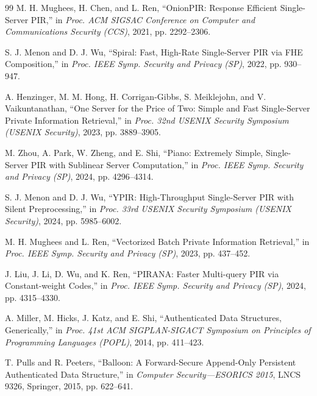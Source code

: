 \begin{thebibliography}{99}
M. H. Mughees, H. Chen, and L. Ren,
\newblock ``OnionPIR: Response Efficient Single-Server PIR,''
\newblock in \emph{Proc. ACM SIGSAC Conference on Computer and Communications Security (CCS)}, 2021, pp. 2292--2306.

S. J. Menon and D. J. Wu,
\newblock ``Spiral: Fast, High-Rate Single-Server PIR via FHE Composition,''
\newblock in \emph{Proc. IEEE Symp. Security and Privacy (SP)}, 2022, pp. 930--947.

A. Henzinger, M. M. Hong, H. Corrigan-Gibbs, S. Meiklejohn, and V. Vaikuntanathan,
\newblock ``One Server for the Price of Two: Simple and Fast Single-Server Private Information Retrieval,''
\newblock in \emph{Proc. 32nd USENIX Security Symposium (USENIX Security)}, 2023, pp. 3889--3905.

M. Zhou, A. Park, W. Zheng, and E. Shi,
\newblock ``Piano: Extremely Simple, Single-Server PIR with Sublinear Server Computation,''
\newblock in \emph{Proc. IEEE Symp. Security and Privacy (SP)}, 2024, pp. 4296--4314.

S. J. Menon and D. J. Wu,
\newblock ``YPIR: High-Throughput Single-Server PIR with Silent Preprocessing,''
\newblock in \emph{Proc. 33rd USENIX Security Symposium (USENIX Security)}, 2024, pp. 5985--6002.

M. H. Mughees and L. Ren,
\newblock ``Vectorized Batch Private Information Retrieval,''
\newblock in \emph{Proc. IEEE Symp. Security and Privacy (SP)}, 2023, pp. 437--452.

J. Liu, J. Li, D. Wu, and K. Ren,
\newblock ``PIRANA: Faster Multi-query PIR via Constant-weight Codes,''
\newblock in \emph{Proc. IEEE Symp. Security and Privacy (SP)}, 2024, pp. 4315--4330.

A. Miller, M. Hicks, J. Katz, and E. Shi,
\newblock ``Authenticated Data Structures, Generically,''
\newblock in \emph{Proc. 41st ACM SIGPLAN-SIGACT Symposium on Principles of Programming Languages (POPL)}, 2014, pp. 411--423.

T. Pulls and R. Peeters,
\newblock ``Balloon: A Forward-Secure Append-Only Persistent Authenticated Data Structure,''
\newblock in \emph{Computer Security---ESORICS 2015}, LNCS 9326, Springer, 2015, pp. 622--641.

\end{thebibliography}

\appendices


